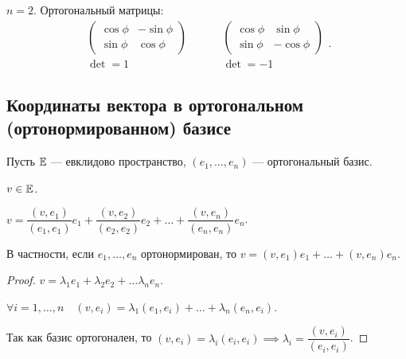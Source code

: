 \begin{example}
    $n = 2$.
    Ортогональный матрицы:
    \begin{equation}
        \begin{gathered}
            \begin{pmatrix} 
                \cos \phi & -\sin \phi \\
                \sin \phi & \cos \phi
            \end{pmatrix} \\
            \det = 1
        \end{gathered}
        \hspace{1cm}
        \begin{gathered}
            \begin{pmatrix} 
                \cos \phi & \sin \phi \\
                \sin \phi & -\cos \phi
            \end{pmatrix} \\
            \det = -1
        \end{gathered}
    .\end{equation}
\end{example}


\subsection{Координаты вектора в ортогональном (ортонормированном) базисе}

Пусть $\mathbb{E}$ --- евклидово пространство, $(e_1, \dots, e_n)$ --- ортогональный базис.

$v \in \mathbb{E}$.

\begin{proposal}
    $v = \dfrac{(v, e_1)}{(e_1, e_1)}e_1 + \dfrac{(v, e_2)}{(e_2, e_2)}e_2 + \dots + \dfrac{(v, e_n)}{(e_n, e_n)}e_n$.

    В частности, если $e_1, \dots, e_n$ ортонормирован, то $v = (v, e_1)e_1 + \dots + (v, e_n) e_n$.
\end{proposal}

\begin{proof}
    $v = \lambda_1 e_1 + \lambda_2 e_2 + \dots \lambda_n e_n$.

    $\forall i = 1, \dots, n \quad (v, e_i) = \lambda_1 (e_1, e_i) + \dots + \lambda_n (e_n, e_i)$.

    Так как базис ортогонален, то $(v, e_i) = \lambda_i (e_i, e_i) \implies \lambda_i = \dfrac{(v, e_i)}{(e_i, e_i)}$.
\end{proof}


